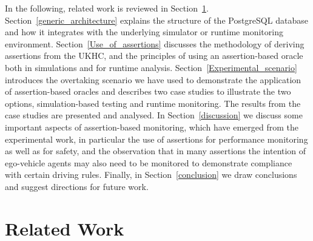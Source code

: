 In the following, related work is reviewed in Section~\ref{Related_work}. Section~\ref{generic_architecture} explains the structure of the PostgreSQL database and how it integrates with the underlying simulator or runtime monitoring environment. Section~\ref{Use_of_assertions} discusses the  methodology of deriving assertions from the UKHC, and the principles of using an assertion-based oracle both in simulations and for runtime analysis. Section~\ref{Experimental_scenario} introduces the overtaking scenario we have used to demonstrate the application of assertion-based oracles and describes two case studies to illustrate the two options, simulation-based testing and runtime monitoring. The results from the case studies are presented and analysed. In Section~\ref{discussion} we discuss some important aspects of assertion-based monitoring, which have emerged from the experimental work, in particular the use of assertions for performance monitoring as well as for safety, and the observation that in many assertions the intention of ego-vehicle agents may also need to be monitored to demonstrate compliance with certain driving rules. Finally, in Section~\ref{conclusion} we draw conclusions and suggest directions for future work.




\section{Related Work}
\label{Related_work}

